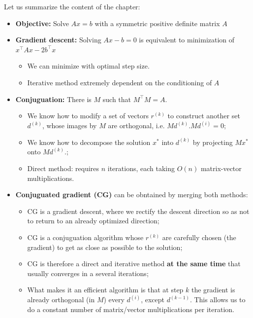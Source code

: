 \documentclass[notitlepage,oneside]{book}
\begin{document}
Let us summarize the content of the chapter:
\begin{framed}
\begin{itemize}
\item \textbf{Objective:} Solve $Ax=b$ with a symmetric positive definite matrix $A$
\item \textbf{Gradient descent:} Solving $Ax-b =0$ is equivalent to minimization of $x^\top Ax-2b^\top x$
  \begin{itemize}
  \item We can minimize with optimal step size.
  \item Iterative method extremely dependent on the conditioning of $A$
  \end{itemize}
\item \textbf{Conjuguation:} There is $M$ such that $M^\top M=A$.
  \begin{itemize}
  \item We know how to modify a set of vectors $r^{(k)}$ to construct another set $d^{(k)}$, whose images by $M$ are orthogonal, i.e. $Md^{(k)}.Md^{(i)}=0$;
  \item We know how to decompose the solution $x^*$ into $d^{(k)}$ by projecting  $Mx^*$ onto $Md^{(k)}$.;
  \item Direct method: requires $n$ iterations, each taking $O(n)$ matrix-vector multiplications.
  \end{itemize}
\item \textbf{Conjuguated gradient (CG)} can be obntained by merging both methods:
  \begin{itemize}
  \item CG is a gradient descent, where we rectify the descent direction so as not to return to an already optimized direction;
  \item CG is a conjuguation algorithm whose $r^{(k)}$  are carefully chosen (the gradient) to get as close as possible to the solution;
  \item CG is therefore a direct and iterative method \textbf{at the same time} that usually converges in a several iterations;
  \item What makes it an efficient algorithm is that at step $k$ the gradient is already orthogonal (in $M$) every $d^{(i)}$, except $d^{(k-1)}$. This allows us to do a constant number of matrix/vector multiplications per iteration.
  \end{itemize}
\end{itemize}
\end{framed}
\end{document}
